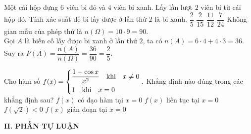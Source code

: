 \begin{ex}%
	Một cái hộp đựng $6$ viên bi đỏ và $4$ viên bi xanh. Lấy lần lượt $2$ viên bi từ cái hộp đó. Tính xác suất để bi lấy được ở lần thứ $2$ là bi xanh.
	\choice 
	{\True $\dfrac{2}{5}$}
	{$\dfrac{2}{15}$}
	{$\dfrac{11}{12}$}
	{$\dfrac{7}{24}$}
	\loigiai
	{Không gian mẫu của phép thử là $n\left( \Omega \right) = 10\cdot 9=90.$\\
		Gọi $A$ là biến cố lấy được bi xanh ở lần thứ $2$, ta có $n(A)=6 \cdot4 + 4\cdot 3=36.$\\
		Suy ra $P(A)= \dfrac{n(A)}{n(\Omega)}= \dfrac{36}{90}= \dfrac{2}{5}.$
	}
	
\end{ex}

\begin{ex}%
	Cho hàm số $f(x)= \left\{\begin{aligned}& \dfrac{1- \cos {x}}{x^2} \quad \text{khi} \quad x \neq 0\\& 1 \quad \text{khi}\quad x=0\end{aligned}\right..$ Khẳng định nào đúng trong các khẳng định sau?
	\choice
	{$f(x)$ có đạo hàm tại $x=0$}
	{$f(x)$ liên tục tại $x=0$}
	{$f( \sqrt{2})<0$}
	{\True $f(x)$ gián đoạn tại $x=0$}
	
	
	
\end{ex}
\noindent\textbf{II. PHẦN TỰ LUẬN}
